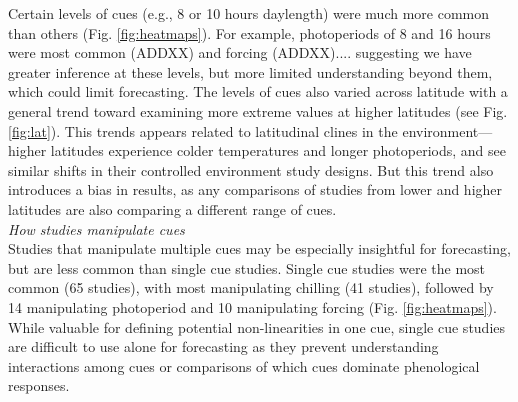 \documentclass[11pt,letter]{article}
\begin{document}
Certain levels of cues (e.g., 8 or 10 hours daylength) were much more common than others (Fig. \ref{fig:heatmaps}). For example, photoperiods of 8 and 16 hours were most common (ADDXX) and forcing (ADDXX).... suggesting we have greater inference at these levels, but more limited understanding beyond them, which could limit forecasting. The levels of cues also varied across latitude with a general trend toward examining more extreme values at higher latitudes (see Fig. \ref{fig:lat}). This trends appears related to latitudinal clines in the environment---higher latitudes experience colder temperatures and longer photoperiods, and see similar shifts in their controlled environment study designs. But this trend also introduces a bias in results, as any comparisons of studies from lower and higher latitudes are also comparing a different range of cues. \\



\emph{How studies manipulate cues}\\
Studies that manipulate multiple cues may be especially insightful for forecasting, but are less common than single cue studies. Single cue studies were the most common (65 studies),  with most manipulating chilling  (41 studies), followed by 14 manipulating photoperiod and 10 manipulating forcing (Fig. \ref{fig:heatmaps}). While valuable for defining potential non-linearities in one cue, single cue studies are difficult to use alone for forecasting as they prevent understanding interactions among cues or comparisons of which cues dominate phenological responses. \\
\end{document}
